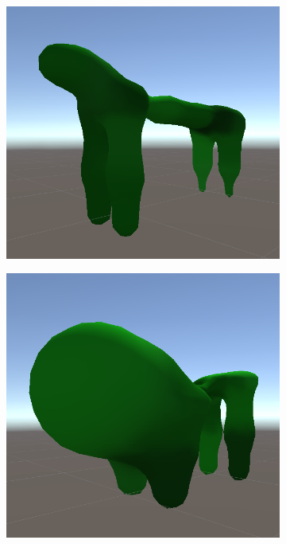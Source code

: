 \begin{figure}[ht]
\begin{subfigure}[b]{0.2\textwidth}
    \end{subfigure}
    \begin{subfigure}[b]{0.2\textwidth}
        \centering
        \includegraphics[width=\textwidth, height=\textwidth]{resources/img/Finished_Creatures_4/creature_7}
    \end{subfigure}
    \begin{subfigure}[b]{0.2\textwidth}
        \centering
        \includegraphics[width=\textwidth, height=\textwidth]{resources/img/Finished_Creatures_4/creature_8}

\end{subfigure}
\end{figure}
